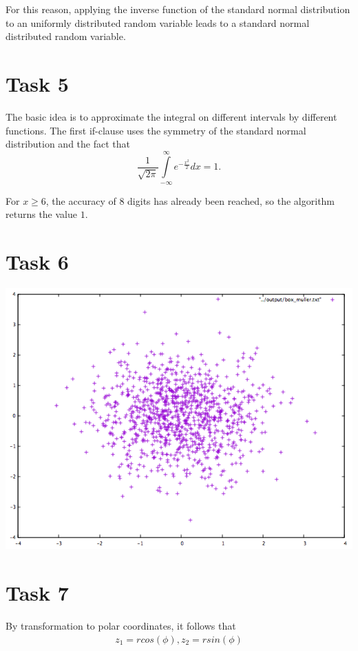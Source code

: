 \documentclass[10pt,a4paper]{article}
\begin{document}
For this reason, applying the inverse function of the standard normal distribution to an uniformly distributed random variable leads to a standard normal distributed random variable.  

\section*{Task 5}

The basic idea is to approximate the integral on different intervals by different functions. The first if-clause uses the symmetry of the standard normal distribution and the fact that 
\[
	\frac{1}{\sqrt{2 \pi}}\int\limits_{-\infty}^{\infty}e^{-\frac{x^2}{2}}dx=1.
\]

For $x\geq 6$, the accuracy of $8$ digits has already been reached, so the algorithm returns the value $1$.

\section*{Task 6}

\begin{center}
\includegraphics[scale=0.4]{box_mueller.jpeg}
\end{center}

\section*{Task 7}

By transformation to polar coordinates, it follows that
\begin{align*}
	z_1=r cos(\phi), z_2=r sin(\phi)
\end{align*}   
\end{document}
